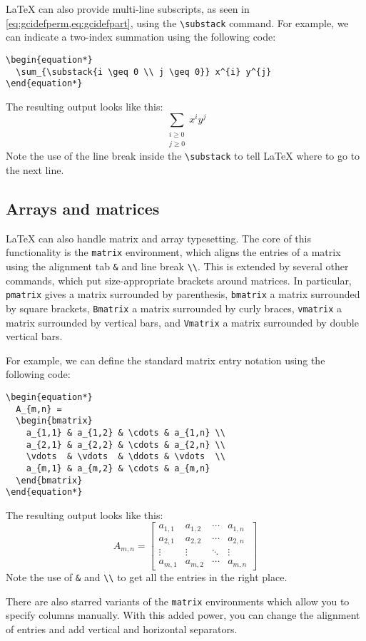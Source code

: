 \documentclass{article}
\newcommand*{\code}[1]{\texttt{#1}}
\begin{document}
\LaTeX{} can also provide multi-line subscripts, as seen in \cref{eq:gcidefperm,eq:gcidefpart}, using the \code{\textbackslash{}substack} command.
For example, we can indicate a two-index summation using the following code:
\begin{verbatim}
\begin{equation*}
  \sum_{\substack{i \geq 0 \\ j \geq 0}} x^{i} y^{j}
\end{equation*}
\end{verbatim}
The resulting output looks like this:
\begin{equation*}
  \sum_{\substack{i \geq 0 \\ j \geq 0}} x^{i} y^{j}
\end{equation*}
Note the use of the line break inside the \code{\textbackslash{}substack} to tell \LaTeX{} where to go to the next line.

\subsection{Arrays and matrices}
\LaTeX{} can also handle matrix and array typesetting.
The core of this functionality is the \code{matrix} environment, which aligns the entries of a matrix using the alignment tab \code{\&} and line break \code{\textbackslash{}\textbackslash{}}.
This is extended by several other commands, which put size-appropriate brackets around matrices.
In particular, \code{pmatrix} gives a matrix surrounded by parenthesis, \code{bmatrix} a matrix surrounded by square brackets, \code{Bmatrix} a matrix surrounded by curly braces, \code{vmatrix} a matrix surrounded by vertical bars, and \code{Vmatrix} a matrix surrounded by double vertical bars.

For example, we can define the standard matrix entry notation using the following code:
\begin{verbatim}
\begin{equation*}
  A_{m,n} =
  \begin{bmatrix}
    a_{1,1} & a_{1,2} & \cdots & a_{1,n} \\
    a_{2,1} & a_{2,2} & \cdots & a_{2,n} \\
    \vdots  & \vdots  & \ddots & \vdots  \\
    a_{m,1} & a_{m,2} & \cdots & a_{m,n}
  \end{bmatrix}
\end{equation*}
\end{verbatim}
The resulting output looks like this:
\begin{equation*}
  A_{m,n} =
  \begin{bmatrix}
    a_{1,1} & a_{1,2} & \cdots & a_{1,n} \\
    a_{2,1} & a_{2,2} & \cdots & a_{2,n} \\
    \vdots  & \vdots  & \ddots & \vdots  \\
    a_{m,1} & a_{m,2} & \cdots & a_{m,n}
  \end{bmatrix}
\end{equation*}
Note the use of \code{\&} and \code{\textbackslash{}\textbackslash{}} to get all the entries in the right place.

There are also starred variants of the \code{matrix} environments which allow you to specify columns manually.
With this added power, you can change the alignment of entries and add vertical and horizontal separators.
\end{document}
